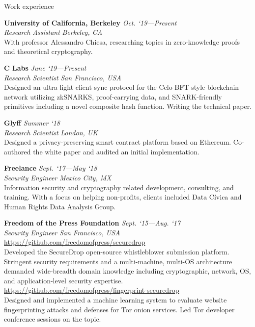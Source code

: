\documentclass{cv}
\begin{document}

\begin{rSection}{Work experience}

\textbf{University of California, Berkeley} \hfill \emph{Oct. `19---Present} \\
\emph{Research Assistant} \hfill \emph{Berkeley, CA} \\
{\small With professor Alessandro Chiesa, researching topics in zero-knowledge proofs and theoretical cryptography.}

\textbf{C Labs} \hfill \emph{June `19---Present} \\
\emph{Research Scientist} \hfill \emph{San Francisco, USA} \\
{\small Designed an ultra-light client sync protocol for the Celo BFT-style blockchain network utilizing zkSNARKS, proof-carrying data, and SNARK-friendly primitives including a novel composite hash function. Writing the technical paper.}

\textbf{Glyff} \hfill \emph{Summer `18} \\
\emph{Research Scientist} \hfill \emph{London, UK} \\
{\small Designed a privacy-preserving smart contract platform based on Ethereum. Co-authored the white paper and audited an initial implementation.}

\textbf{Freelance} \hfill \emph{Sept. `17---May `18} \\
\emph{Security Engineer} \hfill \emph{Mexico City, MX} \\
{\small Information security and cryptography related development, consulting, and training. With a focus on helping non-profits, clients included Data Cívica and Human Rights Data Analysis Group.}

\textbf{Freedom of the Press Foundation} \hfill \emph{Sept. `15---Aug. `17} \\
\emph{Security Engineer} \hfill \emph{San Francisco, USA} \\
\url{https://github.com/freedomofpress/securedrop} \\
{\small Developed the SecureDrop open-source whistleblower submission platform. Stringent security requirements and a multi-machine, multi-OS architecture demanded wide-breadth domain knowledge including cryptographic, network, OS, and application-level security expertise.} \\
\url{https://github.com/freedomofpress/fingerprint-securedrop} \\
{\small Designed and implemented a machine learning system to evaluate website fingerprinting attacks and defenses for Tor onion services. Led Tor developer conference sessions on the topic.}

\end{rSection}
\end{document}
